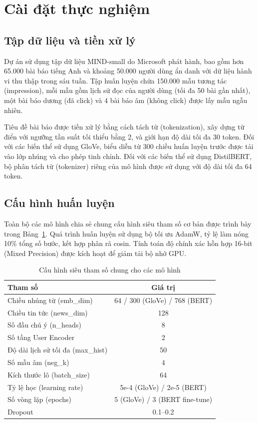 \documentclass[../BTL.tex]{subfiles}
\begin{document}
\section{Cài đặt thực nghiệm}

\subsection{Tập dữ liệu và tiền xử lý}

Dự án sử dụng tập dữ liệu MIND-small do Microsoft phát hành, bao gồm hơn 65.000 bài báo tiếng Anh và khoảng 50.000 người dùng ẩn danh với dữ liệu hành vi thu thập trong sáu tuần. Tập huấn luyện chứa 150.000 mẫu tương tác (impression), mỗi mẫu gồm lịch sử đọc của người dùng (tối đa 50 bài gần nhất), một bài báo dương (đã click) và 4 bài báo âm (không click) được lấy mẫu ngẫu nhiên.

Tiêu đề bài báo được tiền xử lý bằng cách tách từ (tokenization), xây dựng từ điển với ngưỡng tần suất tối thiểu bằng 2, và giới hạn độ dài tối đa 30 token. Đối với các biến thể sử dụng GloVe, biểu diễn từ 300 chiều huấn luyện trước được tải vào lớp nhúng và cho phép tinh chỉnh. Đối với các biến thể sử dụng DistilBERT, bộ phân tách từ (tokenizer) riêng của mô hình được sử dụng với độ dài tối đa 64 token.

\subsection{Cấu hình huấn luyện}

Toàn bộ các mô hình chia sẻ chung cấu hình siêu tham số cơ bản được trình bày trong Bảng~\ref{tab:hyperparams}. Quá trình huấn luyện sử dụng bộ tối ưu AdamW, tỷ lệ làm nóng 10\% tổng số bước, kết hợp phân rã cosin. Tính toán độ chính xác hỗn hợp 16-bit (Mixed Precision) được kích hoạt để giảm tải bộ nhớ GPU.

\begin{table}[H]
\centering
\caption{Cấu hình siêu tham số chung cho các mô hình}
\label{tab:hyperparams}
\begin{tabular}{|l|c|}
\hline
Tham số & Giá trị \\
\hline
Chiều nhúng từ (emb\_dim) & 64 / 300 (GloVe) / 768 (BERT) \\
\hline
Chiều tin tức (news\_dim) & 128 \\
\hline
Số đầu chú ý (n\_heads) & 8 \\
\hline
Số tầng User Encoder & 2 \\
\hline
Độ dài lịch sử tối đa (max\_hist) & 50 \\
\hline
Số mẫu âm (neg\_k) & 4 \\
\hline
Kích thước lô (batch\_size) & 64 \\
\hline
Tỷ lệ học (learning rate) & 5e-4 (GloVe) / 2e-5 (BERT) \\
\hline
Số vòng lặp (epochs) & 5 (GloVe) / 3 (BERT fine-tune) \\
\hline
Dropout & 0.1--0.2 \\
\hline
\end{tabular}
\end{table}
\end{document}
